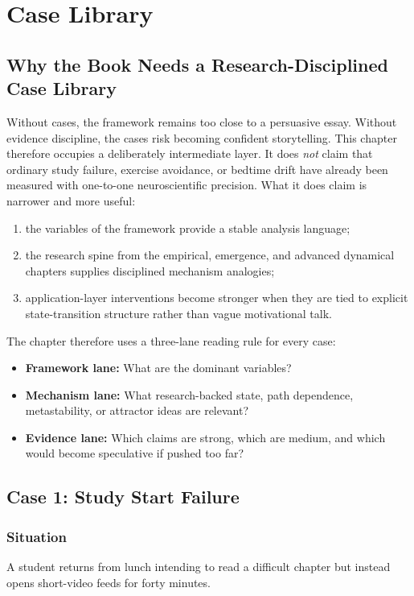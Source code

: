 \chapter{Case Library}
\label{ch:cases}

\section{Why the Book Needs a Research-Disciplined Case Library}

Without cases, the framework remains too close to a persuasive essay. Without
evidence discipline, the cases risk becoming confident storytelling. This
chapter therefore occupies a deliberately intermediate layer. It does
\emph{not} claim that ordinary study failure, exercise avoidance, or bedtime
drift have already been measured with one-to-one neuroscientific precision.
What it does claim is narrower and more useful:
\begin{enumerate}[nosep]
  \item the variables of the framework provide a stable analysis language;
  \item the research spine from the empirical, emergence, and advanced
        dynamical chapters supplies disciplined mechanism analogies;
  \item application-layer interventions become stronger when they are tied to
        explicit state-transition structure rather than vague motivational talk.
\end{enumerate}

The chapter therefore uses a three-lane reading rule for every case:
\begin{itemize}[nosep]
  \item \textbf{Framework lane:} What are the dominant variables?
  \item \textbf{Mechanism lane:} What research-backed state, path dependence,
        metastability, or attractor ideas are relevant?
  \item \textbf{Evidence lane:} Which claims are strong, which are medium, and
        which would become speculative if pushed too far?
\end{itemize}

\section{Case 1: Study Start Failure}

\subsection*{Situation}
A student returns from lunch intending to read a difficult chapter but instead
opens short-video feeds for forty minutes.

